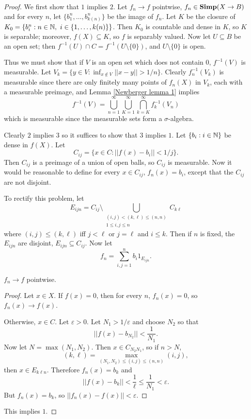 \begin{proof}
We first show that $1$ implies $2$.
Let $f_{n} \to f$ pointwise, $f_{n} \in \mathbf{Simp}(X \to B)$ and for every $n$, let $\{b_1^n, \dots, b_{k(n)}^n\}$ be the image of $f_{n}$.
Let $K$ be the closure of $K_0 = \{b_i^n: n \in \mathbb{N},~i \in \{1, \dots, k(n)\}\}$.
Then $K_0$ is countable and dense in $K$, so $K$ is separable; moreover, $f(X) \subseteq K$, so $f$ is separably valued.
Now let $U \subseteq B$ be an open set; then $f^{-1}(U) \cap C = f^{-1}(U \setminus \{0\})$, and $U \setminus \{0\}$ is open.

Thus we must show that if $V$ is an open set which does not contain $0$, $f^{-1}(V)$ is measurable. Let $V_{k} = \{y \in V: \inf_{x \notin V} ||x - y|| > 1/n\}$. Clearly $f_{n}^{-1}(V_{k})$ is measurable since there are only finitely many points of $f_{n}(X)$ in $V_{k}$, each with a measurable preimage, and Lemma \ref{Newberger lemma 1} implies
\[f^{-1}(V) = \bigcup_{n=1}^{\infty} \bigcup_{K=1}^{\infty} \bigcap_{k=K}^{\infty} f_{k}^{-1}(V_{n})\]
which is measurable since the measurable sets form a $\sigma$-algebra.

Clearly $2$ implies $3$ so it suffices to show that $3$ implies $1$.
Let $\{b_i: i \in \mathbb{N}\}$ be dense in $f(X)$.
Let
\[C_{ij} = \{x \in C: ||f(x) - b_i|| < 1/j\}.\]
Then $C_{ij}$ is a preimage of a union of open balls, so $C_{ij}$ is measurable.
Now it would be reasonable to define for every $x \in C_{ij}$, $f_{n}(x) = b_i$, except that the $C_{ij}$ are not disjoint.

To rectify this problem, let
\[E_{ijn} = C_{ij} \setminus \bigcup_{\substack{(i,j) < (k, \ell) \leq (n, n)\\1 \leq i,j \leq n}} C_{k\ell}\]
where $(i, j) \leq (k, \ell)$ iff $j < \ell$ or $j = \ell$ and $i \leq k$.
Then if $n$ is fixed, the $E_{ijn}$ are disjoint, $E_{ijn} \subseteq C_{ij}$.
Now let
\[f_{n} = \sum_{i,j=1}^{n} b_{i} 1_{E_{ijn}}.\]
\begin{sublemma}
$f_{n} \to f$ pointwise.
\end{sublemma}
\begin{proof}
Let $x \in X$. If $f(x) = 0$, then for every $n$, $f_{n}(x) = 0$, so $f_{n}(x) \to f(x)$.

Otherwise, $x \in C$. Let $\varepsilon > 0$. Let $N_1 > 1/\varepsilon$ and choose $N_2$ so that
\[||f(x) - b_{N_2}|| < \frac{1}{N_1}.\]
Now let $N = \max(N_1, N_2)$. Then $x \in C_{N_2N_1}$, so if $n > N$,
\[(k, \ell) = \max_{(N_1, N_2) \leq (i, j) \leq (n, n)} (i,j),\]
then $x \in E_{k\ell n}$. Therefore $f_{n}(x) = b_{k}$ and
\[||f(x) - b_{k}|| < \frac{1}{\ell} \leq \frac{1}{N_1} < \varepsilon.\]
But $f_{n}(x) = b_{k}$, so $||f_{n}(x) - f(x)|| < \varepsilon$.
\end{proof}
This implies $1$.
\end{proof}


